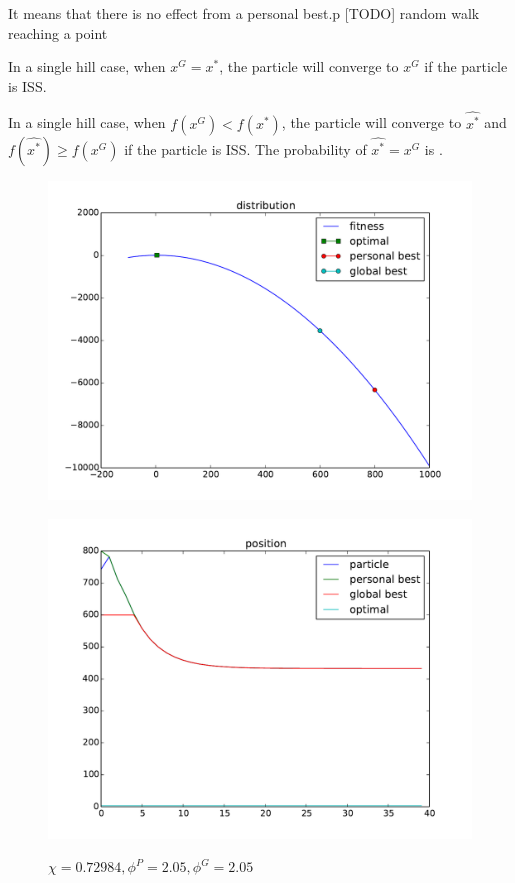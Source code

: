 It means that there is no effect from a personal best.p
[TODO] random walk reaching a point


\begin{mylem}
In a single hill case, when $ x^{G} = x^{*} $, the particle will converge to $ x^{G} $ if the particle is ISS.
\end{mylem}

\begin{mylem}
In a single hill case, when $ f( x^{G} ) < f( x^{*}) $, the particle will converge to $ \hat{x^{*}} $ and $ f(\hat{x^{*}}) \geq f(x^{G}) $ if the particle is ISS.
The probability of $ \hat{x^{*}} = x^{G} $ is .
\end{mylem}

\begin{figure}[ht]
\centering
\includegraphics[width=.7\linewidth]{./simfig/case1/distribution1}
\label{fig:case1-1:distribution} 
\end{figure}

\begin{figure}[ht]
\centering
\includegraphics[width=.7\linewidth]{./simfig/case1/position1-1} 
\label{fig:case1-1:position}
\caption{$ \chi = 0.72984 , \phi^{P} = 2.05 , \phi^{G} = 2.05 $ }
\end{figure}

